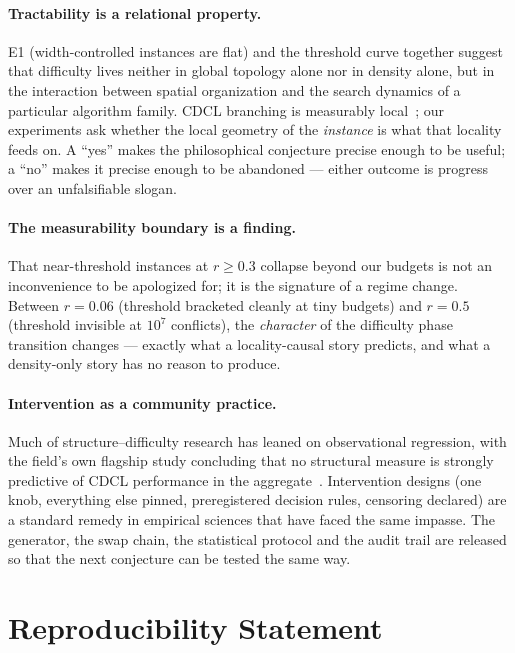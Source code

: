\documentclass[pdflatex,sn-basic,Numbered]{sn-jnl}
\begin{document}
\paragraph{Tractability is a relational property.}
E1 (width-controlled instances are flat) and the threshold curve together
suggest that difficulty lives neither in global topology alone nor in density
alone, but in the interaction between spatial organization and the search
dynamics of a particular algorithm family. CDCL branching is measurably
local~\cite{zulkoski2018}; our experiments ask whether the local geometry of
the \emph{instance} is what that locality feeds on. A ``yes'' makes the
philosophical conjecture precise enough to be useful; a ``no'' makes it
precise enough to be abandoned --- either outcome is progress over an
unfalsifiable slogan.

\paragraph{The measurability boundary is a finding.}
That near-threshold instances at $r\ge0.3$ collapse beyond our budgets is not
an inconvenience to be apologized for; it is the signature of a regime
change. Between $r=0.06$ (threshold bracketed cleanly at tiny budgets) and
$r=0.5$ (threshold invisible at $10^7$ conflicts), the \emph{character} of the
difficulty phase transition changes --- exactly what a locality-causal story
predicts, and what a density-only story has no reason to produce.

\paragraph{Intervention as a community practice.}
Much of structure--difficulty research has leaned on observational
regression, with the field's own flagship study concluding that no structural
measure is strongly predictive of CDCL performance in the
aggregate~\cite{zulkoski2018}.
Intervention designs (one knob, everything else pinned, preregistered
decision rules, censoring declared) are a standard remedy in empirical
sciences that have faced the same impasse. The generator, the swap
chain, the statistical protocol and the audit trail are released so that the
next conjecture can be tested the same way.

\section{Reproducibility Statement}
\label{sec:repro}
\end{document}
